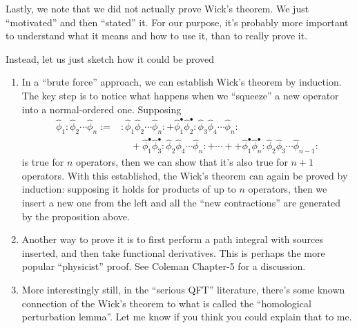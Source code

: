 Lastly, we note that we did not actually prove Wick's theorem. We just ``motivated'' and then ``stated'' it. For our purpose, it's probably more important to understand what it means and how to use it, than to really prove it.

Instead, let us just sketch how it could be proved
\begin{enumerate}
    \item In a ``brute force'' approach, we can establish Wick's theorem by induction. The key step is to notice what happens when we ``squeeze'' a new operator into a normal-ordered one. Supposing
    \begin{align*}
        \hat{\phi}_1:\hat{\phi}_2\cdots \hat{\phi}_n:=&:\hat{\phi}_1\hat{\phi}_2\cdots \hat{\phi}_n:+\hat{\phi}_{1}^{\bullet}\hat{\phi}_{2}^{\bullet}:\hat{\phi}_3\hat{\phi}_4\cdots \hat{\phi}_n:\\
        &\quad+\hat{\phi}_{1}^{\bullet}\hat{\phi}_{3}^{\bullet}:\hat{\phi}_2\hat{\phi}_4\cdots \hat{\phi}_n:+\cdots ++\hat{\phi}_{1}^{\bullet}\hat{\phi}_{n}^{\bullet}:\hat{\phi}_2\hat{\phi}_3\cdots \hat{\phi}_{n-1}:
    \end{align*}
    is true for $n$ operators, then we can show that it's also true for $n+1$ operators. With this established, the Wick's theorem can again be proved by induction: supposing it holds for products of up to $n$ operators, then we insert a new one from the left and all the ``new contractions'' are generated by the proposition above.
    \item Another way to prove it is to first perform a path integral with sources inserted, and then take functional derivatives. This is perhaps the more popular ``physicist'' proof. See Coleman Chapter-5 for a discussion.
    \item More interestingly still, in the ``serious QFT'' literature, there's some known connection of the Wick's theorem to what is called the ``homological perturbation lemma''. Let me know if you think you could explain that to me.
\end{enumerate}
